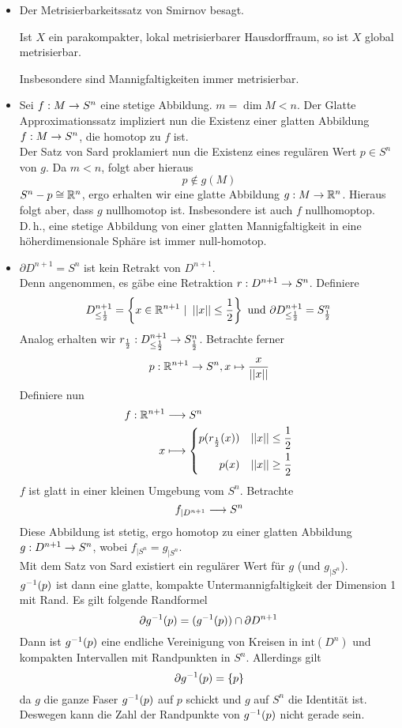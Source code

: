 \Bem{}
\begin{itemize}
\item Der Metrisierbarkeitssatz von Smirnov besagt.
\begin{center}
	Ist $X$ ein parakompakter, lokal metrisierbarer Hausdorffraum, so ist $X$ global metrisierbar.
\end{center}
Insbesondere sind Mannigfaltigkeiten immer metrisierbar.
\item Sei $ f: M \overset{}{\rightarrow} S^n$ eine stetige Abbildung. $m = \dim M < n$. Der Glatte Approximationssatz impliziert nun die Existenz einer glatten Abbildung $f : M \overset{}{\rightarrow} S^n$, die homotop zu $f$ ist.\\
Der Satz von Sard proklamiert nun die Existenz eines regulären Wert $p \in S^n$ von $g$. Da $m < n$, folgt aber hieraus
\[ p \notin g(M) \]
$S^n- p \overset{}{\cong} \mathbb{R}^n$, ergo erhalten wir eine glatte Abbildung $ g : M \overset{}{\rightarrow} \mathbb{R}^n$. Hieraus folgt aber, dass $g$ nullhomotop ist. Insbesondere ist auch $f$ nullhomoptop.\\
D.\,h., eine stetige Abbildung von einer glatten Mannigfaltigkeit in eine höherdimensionale Sphäre ist immer null-homotop.
\item $\partial D^{n+1} = S^n$ ist kein Retrakt von $D^{n+1}$.\\
Denn angenommen, es gäbe eine Retraktion $r : D^{n+1} \overset{}{\rightarrow} S^n$. Definiere
\[ D^{n+1}_{\leq \frac{1}{2}} = \set{ x \in \R^{n+1} }{\norm{x} \leq \frac{1}{2}} \text{ und } \partial D^{n+1}_{\leq \frac{1}{2}} = S^n_{\frac{1}{2}} \]
Analog erhalten wir $r_{\frac{1}{2}} : D^{n+1}_{\leq\frac{1}{2}} \overset{}{\rightarrow} S^n_{\frac{1}{2}}$. Betrachte ferner
\[ p:\mathbb{R}^{n+1} \overset{}{\rightarrow} S^n, x \mapsto \frac{x}{\left|\left|x\right|\right|} \]
Definiere nun
\begin{align*}
f : \mathbb{R}^{n+1} & \overset{}{\longrightarrow} S^n\\
x & \longmapsto \left\lbrace
\begin{aligned}
p(r_{\frac{1}{2}}(x)) && \left|\left|x\right|\right| \leq \frac{1}{2}\\
p(x) && \left|\left|x\right|\right| \geq \frac{1}{2}
\end{aligned}
\right.
\end{align*}
$f$ ist glatt in einer kleinen Umgebung vom $S^n$. Betrachte
\[ f_{|D^{n+1}} \overset{}{\longrightarrow} S^n \]
Diese Abbildung ist stetig, ergo homotop zu einer glatten Abbildung $g : D^{n+1} \overset{}{\rightarrow} S^n$, wobei $f_{|S^n} = g_{|S^n}$.\\
Mit dem Satz von Sard existiert ein regulärer Wert für $g$ (und $g_{|S^n}$).\\
$g^{-1}(p)$ ist dann eine glatte, kompakte Untermannigfaltigkeit der Dimension 1 mit Rand. Es gilt folgende Randformel
\[ \partial g^{-1}(p) = (g^{-1}(p)) \cap \partial D^{n+1} \]
Dann ist $g^{-1}(p)$ eine endliche Vereinigung von Kreisen in $\text{int}(D^n)$ und kompakten Intervallen mit Randpunkten in $S^n$. Allerdings gilt
\[ \partial g^{-1}(p) = \{ p\} \]
da $g$ die ganze Faser $g^{-1}(p)$ auf $p$ schickt und $g$ auf $S^n$ die Identität ist.
Deswegen kann die Zahl der Randpunkte von $g^{-1}(p)$ nicht gerade sein.
\end{itemize}

